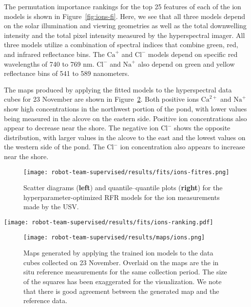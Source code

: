 The permutation importance rankings for the top 25 features of each of the ion models is shown in Figure~\ref{fig:ions-fi}. Here, we see that all three models depend on the solar illumination and viewing geometries as well as the total downwelling intensity and the total pixel intensity measured by the hyperspectral imager. All three models utilize a combination of spectral indices that combine green, red, and infrared reflectance bins. The $\textrm{Ca}^{+}$ and $\textrm{Cl}^{-}$ models depend on specific red wavelengths of 740 to 769 nm. $\textrm{Cl}^{-}$ and $\textrm{Na}^{+}$ also depend on green and yellow reflectance bins of 541 to 589 nanometers.

The maps produced by applying the fitted models to the hyperspectral data cubes for 23 November are shown in Figure~\ref{fig:map-ions}. Both positive ions $\mathrm{Ca}^{2+}$ and $\mathrm{Na}^{+}$ show high concentrations in the northwest portion of the pond, with lower values being measured in the alcove on the eastern side. Positive ion concentrations also appear to decrease near the shore. The negative ion $\mathrm{Cl}^{-}$ shows the opposite distribution, with larger values in the alcove to the east and the lowest values on the western side of the pond. The $\mathrm{Cl}^{-}$ ion concentration also appears to increase near the shore.

\newpage

\begin{figure}[H]
  \centering
  \texttt{[image: robot-team-supervised/results/fits/ions-fitres.png]}
  \caption{Scatter diagrams (\textbf{left}) and quantile--quantile plots
    (\textbf{right}) for the hyperparameter-optimized RFR models for the ion
    measurements made by the USV.\label{fig:ions-fit}}
\end{figure}

\begin{sidewaysfigure}
  \centering
  \texttt{[image: robot-team-supervised/results/fits/ions-ranking.pdf]}
  \caption{Ranked permutation importance for the top 25 features of the ion
    models. The permutation importance measures the decrease in the model's
    $R^2$ value when each feature is replaced by a random permutation of its
    values.\label{fig:ions-fi}}
\end{sidewaysfigure}

\begin{figure}[H]
  \texttt{[image: robot-team-supervised/results/maps/ions.png]}
  \caption{Maps generated by applying the trained ion models to the data cubes
    collected on 23 November. Overlaid on the maps are the in situ reference
    measurements for the same collection period. The size of the squares has
    been exaggerated for the visualization. We note that there is good agreement
    between the generated map and the reference data. \label{fig:map-ions}}
\end{figure}

